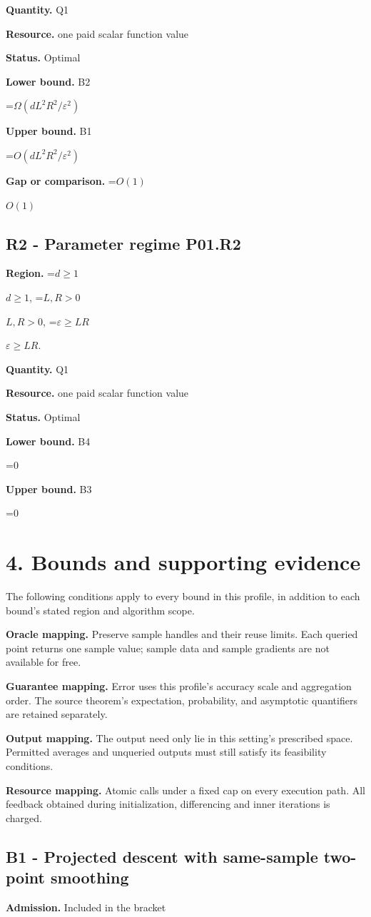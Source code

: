\documentclass[10pt,a4paper]{article}
\newcommand{\AtlasMath}[1]{\par\begingroup\centering\setbox0=\hbox{$\displaystyle #1$}\ifdim\wd0>1.4\linewidth\typeout{ATLAS WIDE FORMULA: \the\wd0}\fi\ifdim\wd0>\linewidth\resizebox{\linewidth}{!}{\box0}\else\box0\fi\par\endgroup}
\newcommand{\AtlasInlineMath}[1]{\begingroup\setbox0=\hbox{$#1$}\ifdim\wd0>.4\linewidth\endgroup\AtlasMath{#1}\else\endgroup$#1$\fi}
\begin{document}
\textbf{Quantity.} Q1

\textbf{Resource.} one paid scalar function value

\textbf{Status.} Optimal

\textbf{Lower bound.} B2

\AtlasMath{\Omega(dL^2R^2/\varepsilon^2)}
\textbf{Upper bound.} B1

\AtlasMath{O(dL^2R^2/\varepsilon^2)}
\textbf{Gap or comparison.} \AtlasInlineMath{O(1)}

\subsection{R2 - Parameter regime P01.R2}
\textbf{Region.} \AtlasInlineMath{d\ge1}, \AtlasInlineMath{L,R>0}, \AtlasInlineMath{\varepsilon\ge LR}.

\textbf{Quantity.} Q1

\textbf{Resource.} one paid scalar function value

\textbf{Status.} Optimal

\textbf{Lower bound.} B4

\AtlasMath{0}
\textbf{Upper bound.} B3

\AtlasMath{0}
\section{4. Bounds and supporting evidence}
The following conditions apply to every bound in this profile, in addition to each bound's stated region and algorithm scope.

\textbf{Oracle mapping.} Preserve sample handles and their reuse limits. Each queried point returns one sample value; sample data and sample gradients are not available for free.

\textbf{Guarantee mapping.} Error uses this profile's accuracy scale and aggregation order. The source theorem's expectation, probability, and asymptotic quantifiers are retained separately.

\textbf{Output mapping.} The output need only lie in this setting's prescribed space. Permitted averages and unqueried outputs must still satisfy its feasibility conditions.

\textbf{Resource mapping.} Atomic calls under a fixed cap on every execution path. All feedback obtained during initialization, differencing and inner iterations is charged.

\subsection{B1 - Projected descent with same-sample two-point smoothing}
\textbf{Admission.} Included in the bracket
\end{document}
